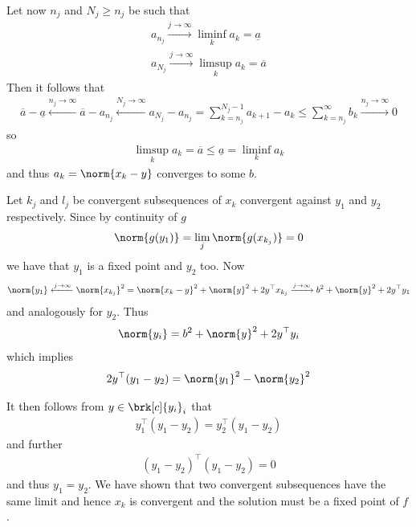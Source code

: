 \begin{frame}
	\begin{proofs}
	Let now $n_j$ and  $N_j\geq n_j$ be such that
	\begin{align*}
		a_{n_j}\xrightarrow{j\to\infty}\liminf_ka_k=\underline{a} \\
		a_{N_j}\xrightarrow{j\to\infty}\limsup_ka_k=\overline{a}	
	\end{align*}
	Then it follows that
	\begin{align*}
		\overline{a}-\underline{a}
		\xleftarrow{n_j\to\infty}\overline{a}-a_{n_j}
		\xleftarrow{N_j\to\infty}a_{N_j}-a_{n_j}
		= \sum_{k=n_j}^{N_j-1}a_{k+1}-a_k
		\leq \sum_{k=n_j}^\infty b_k
		\xrightarrow{n_j\to\infty}0
	\end{align*}
	so
	\begin{align*}
		\limsup_ka_k=\overline{a}\leq \underline{a}=\liminf_ka_k
	\end{align*}
	and thus $a_k=\norm{x_k-y}$ converges to some $b$.
	\end{proofs}
\end{frame}


\begin{frame}
	\begin{proofs}
	Let $k_j$ and $l_j$ be convergent subsequences of $x_k$ convergent against $y_1$ and $y_2$ respectively. Since by continuity of $g$
	\begin{align*}
		\norm{g(y_1)}=\lim_j\norm{g(x_{k_j})}=0
	\end{align*}
	we have that $y_1$ is a fixed point and $y_2$ too.
	Now
	\begin{align*}
		\norm{y_1} 
		\xleftarrow{j\to\infty} \norm{x_{k_j}}^2
		= \norm{x_k-y}^2+\norm{y}^2+2y^\top x_{k_j}
		\xrightarrow{j\to\infty} b^2+\norm{y}^2+2y^\top y_1
	\end{align*}
	and analogously for $y_2$. Thus
	\begin{align*}
		\norm{y_i}=b^2+\norm{y}^2+2y^\top y_i
	\end{align*}
	which implies
	\begin{align*}
		2y^\top(y_1-y_2) = \norm{y_1}^2-\norm{y_2}^2
	\end{align*}
	\end{proofs}
\end{frame}


\begin{frame}
	\begin{proofs}
	It then follows from $y\in\brk[c]{y_i}_i$ that
	\begin{align*}
		y_1^\top(y_1-y_2) = y_2^\top(y_1-y_2)
	\end{align*}
	and further
	\begin{align*}
		(y_1-y_2)^\top(y_1-y_2) = 0
	\end{align*}
	and thus $y_1=y_2$. We have shown that two convergent subsequences have the same limit and hence $x_k$ is convergent and the solution must be a fixed point of $f$.
	\end{proofs}
\end{frame}


